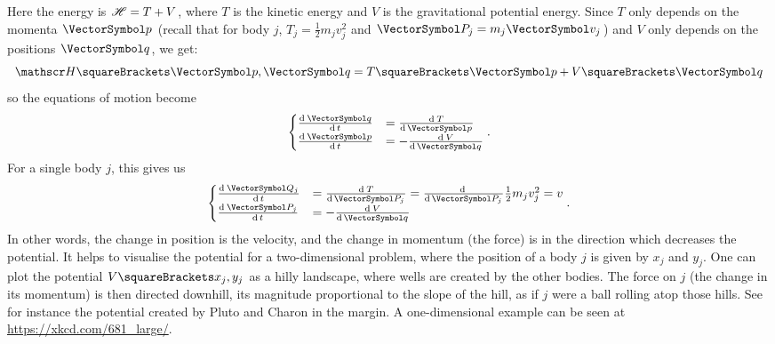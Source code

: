 \documentclass[10pt, a4paper, twoside]{basestyle}
\begin{document}
Here the energy is $\mathscr{H} = T + V$, where $T$ is the kinetic energy
and $V$ is the gravitational potential energy.
Since $T$ only depends on the momenta $\vp$ (recall that for body $j$,
$T_j = \frac{1}{2} m_j v_j^2$ and $\vP_j = m_j\vv_j$) and $V$ only depends
on the positions $\vq$, we get:
\[
\Hamiltonian\of{\vp, \vq} = T\of{\vp} + V\of{\vq}
\]
so the equations of motion become
\[
\begin{cases}
\deriv t {\vq} &= \deriv {\vp} T \\
\deriv t {\vp} &= -\deriv {\vq} V
\end{cases}.
\]
For a single body $j$, this gives us
\[
\begin{cases}
\deriv t {\vQ_j} &= \deriv {\vP_j} T = \derivop {\vP_j}\frac{1}{2} m_j v_j^2
    = v \\
\deriv t {\vP_j} &= -\deriv {\vq} V
\end{cases}.
\]
In other words, the change in position is the velocity, and the change in
momentum (the force) is in the direction which decreases the potential.
It helps to visualise the potential for a two-dimensional problem, where the
position of a body $j$ is given by $x_j$ and $y_j$. One can plot the potential
$V\of{x_j, y_j}$ as a hilly landscape, where wells are created by the other
bodies. The force on $j$ (the change in its momentum) is then directed downhill,
its magnitude proportional to the slope of the hill, as if $j$ were a ball
rolling atop those hills.
See for instance the potential created by Pluto and Charon in the margin.
A one-dimensional example can be seen at \url{https://xkcd.com/681_large/}.
\end{document}
